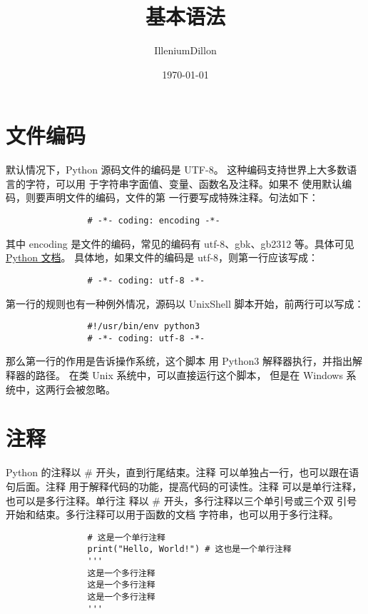 \documentclass[a4paper,12pt]{article}
\begin{document}
    \title{基本语法}
    \author{IlleniumDillon}
    \date{\today}
    \maketitle

    \section{文件编码}
        默认情况下，Python 源码文件的编码是 UTF-8。
        这种编码支持世界上大多数语言的字符，可以用
        于字符串字面值、变量、函数名及注释。如果不
        使用默认编码，则要声明文件的编码，文件的第
        一行要写成特殊注释。句法如下：
        \begin{listing}[h]
            \begin{verbatim}
                # -*- coding: encoding -*-
            \end{verbatim}
        \end{listing}
        其中 encoding 是文件的编码，常见的编码有
        utf-8、gbk、gb2312 等。具体可见\href{https://docs.python.org/zh-cn/3/library/codecs.html#module-codecs}{Python 文档}。
        具体地，如果文件的编码是 utf-8，则第一行应该写成：
        \begin{listing}[h]
            \begin{verbatim}
                # -*- coding: utf-8 -*-
            \end{verbatim}
        \end{listing}
        第一行的规则也有一种例外情况，源码以 
        UnixShell 脚本开始，前两行可以写成：
        \begin{listing}[h]
            \begin{verbatim}
                #!/usr/bin/env python3
                # -*- coding: utf-8 -*-
            \end{verbatim}
        \end{listing}
        那么第一行的作用是告诉操作系统，这个脚本
        用 Python3 解释器执行，并指出解释器的路径。
        在类 Unix 系统中，可以直接运行这个脚本，
        但是在 Windows 系统中，这两行会被忽略。
    \section{注释}
        Python 的注释以 \# 开头，直到行尾结束。注释
        可以单独占一行，也可以跟在语句后面。注释
        用于解释代码的功能，提高代码的可读性。注释
        可以是单行注释，也可以是多行注释。单行注
        释以 \# 开头，多行注释以三个单引号或三个双
        引号开始和结束。多行注释可以用于函数的文档
        字符串，也可以用于多行注释。
        \begin{listing}[h]
            \begin{verbatim}
                # 这是一个单行注释
                print("Hello, World!") # 这也是一个单行注释
                '''
                这是一个多行注释
                这是一个多行注释
                这是一个多行注释
                '''
            \end{verbatim}
        \end{listing}
\end{document}
